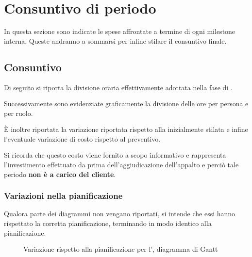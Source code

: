 
\section{Consuntivo di periodo} \label{sec:consuntivo}
In questa sezione sono indicate le spese affrontate a termine di ogni milestone interna. Queste andranno a sommarsi per infine stilare il consuntivo finale.



\newcommand{\introconsuntivo}[1]
{
Di seguito si riporta la divisione oraria effettivamente adottata nella fase di #1.

Successivamente sono evidenziate graficamente la divisione delle ore per persona e per ruolo. 

È inoltre riportata la variazione riportata rispetto alla \gloss{baseline} inizialmente stilata e infine l'eventuale variazione di costo rispetto al preventivo.
}

\subsection{Consuntivo \AR}
\introconsuntivo{\AR}

Si ricorda che questo costo viene fornito a scopo informativo e rappresenta l'investimento effettuato da {\hx} prima dell'aggiudicazione dell'appalto e perciò tale periodo \textbf{non è a carico del cliente}. 

\subsubsection{Variazioni nella pianificazione}

Qualora parte dei diagrammi non vengano riportati, si intende che essi hanno rispettato la corretta pianificazione, terminando in modo identico alla pianificazione.

\begin{figure}[H]
\label{tab:cgen1}

  \caption{Variazione rispetto alla pianificazione per l'\AR, diagramma di Gantt}
\end{figure}

